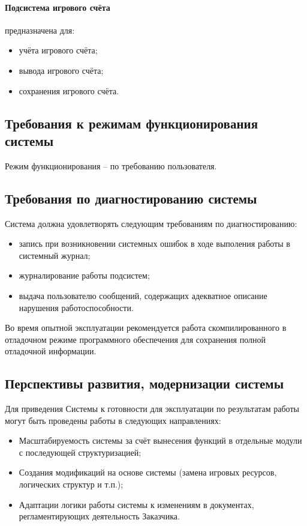 \paragraph{Подсистема игрового счёта}
предназначена для:
\begin{itemize}
    \item учёта игрового счёта;
    \item вывода игрового счёта;
    \item сохранения игрового счёта.
\end{itemize}

\subsection{Требования к режимам функционирования системы}
Режим функционирования -- по требованию пользователя.

\subsection{Требования по диагностированию системы}
Система должна удовлетворять следующим требованиям по диагностированию:
\begin{itemize}
    \item запись при возникновении системных ошибок в ходе выполения работы в системный журнал;
    \item журналирование работы подсистем;
    \item выдача пользователю сообщений, содержащих адекватное описание нарушения 
        работоспособности.
\end{itemize}
Во время опытной эксплуатации рекомендуется работа скомпилированного в отладочном режиме 
программного обеспечения для сохранения полной отладочной информации.

\subsection{Перспективы развития, модернизации системы}
Для приведения Системы к готовности для эксплуатации по результатам работы могут быть 
проведены работы в следующих направлениях:
\begin{itemize}
    \item Масштабируемость системы за счёт вынесения функций в отдельные модули с 
        последующей структуризацией;
    \item Создания модификаций на основе системы (замена игровых ресурсов, логических 
        структур и т.п.);
    \item Адаптации логики работы системы к изменениям в документах, регламентирующих 
        деятельность Заказчика.
\end{itemize}

